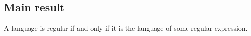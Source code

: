 

\subsection*{Main result}

A language is regular if and only if it is the language of some regular expression.

\blankpage